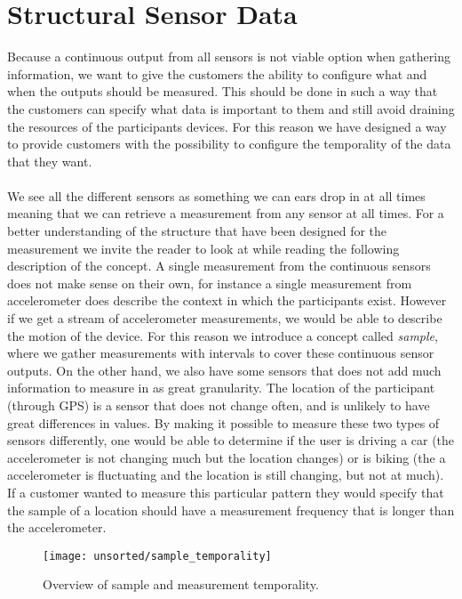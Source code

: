 \section{Structural Sensor Data}
\label{sec:structural_sensor_data}
Because a continuous output from all sensors is not viable option when gathering information, we want to give the customers the ability to configure what and when the outputs should be measured. This should be done in such a way that the customers can specify what data is important to them and still avoid draining the resources of the participants devices. For this reason we have designed a way to provide customers with the possibility to configure the temporality of the data that they want. 
\\\\
We see all the different sensors as something we can ears drop in at all times meaning that we can retrieve a measurement from any sensor at all times. For a better understanding of the structure that have been designed for the measurement we invite the reader to look at  while reading the following description of the concept. A single measurement from the continuous sensors does not make sense on their own, for instance a single measurement from accelerometer does describe the context in which the participants exist. However if we get a stream of accelerometer measurements, we would be able to describe the motion of the device. For this reason we introduce a concept called \emph{sample}, where we gather measurements with intervals to cover these continuous sensor outputs. On the other hand, we also have some sensors that does not add much information to measure in as great granularity. The location of the participant (through GPS) is a sensor that does not change often, and is unlikely to have great differences in values. By making it possible to measure these two types of sensors differently, one would be able to determine if the user is driving a car (the accelerometer is not changing much but the location changes) or is biking (the a accelerometer is fluctuating and the location is still changing, but not at much). If a customer wanted to measure this particular pattern they would specify that the sample of a location should have a measurement frequency that is longer than the accelerometer.

\begin{figure}[!htbp]
    \centering
    \texttt{[image: unsorted/sample\_temporality]}
    \caption{Overview of sample and measurement temporality.}
    \label{fig:sample_temporality}
\end{figure}
\FloatBarrier

